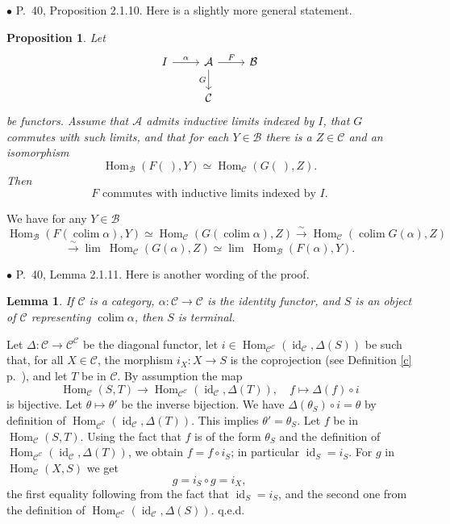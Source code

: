 \documentclass[12pt]{article}
\newtheorem{lem}[thm]{Lemma}
\newtheorem{prop}[thm]{Proposition}
\theoremstyle{remark}%
\newtheorem{rk}[thm]{Remark}
\newcommand{\bu}{\bullet}
\newcommand{\n}{\noindent}
\newcommand{\A}{\mathcal A}
\newcommand{\B}{\mathcal B}
\newcommand{\C}{\mathcal C}
\newcommand{\p}{\varphi}
\newcommand{\pf}{\n{\em Proof. }}
\newcommand{\bl}{\begin{lem}}
\newcommand{\el}{\end{lem}}
\newcommand{\bp}{\begin{prop}}
\newcommand{\ep}{\end{prop}}
\DeclareMathOperator*{\coli}{colim}
\DeclareMathOperator{\id}{id}
\DeclareMathOperator{\Hom}{Hom}
\DeclareMathOperator{\h}{Hom}
\DeclareMathOperator{\Ob}{Ob}
\begin{document}

\n$\bu$ P.~40, Proposition 2.1.10. Here is a slightly more general statement. 
%
\bp 
Let 
$$
\begin{tikzcd}
I\ar{r}{\alpha}&\A\ar{d}[swap]{G}\ar{r}{F}&\B\\
&\C
\end{tikzcd}
$$
be functors. Assume that $\A$ admits inductive limits indexed by $I$, that $G$ commutes with such limits, and that for each $Y\in\B$ there is a $Z\in\C$ and an isomorphism 
$$
\Hom_\B(F(\ ),Y)\simeq\Hom_\C(G(\ ),Z). 
$$
Then 
\begin{equation}\label{2.1.10}
F\text{ commutes with inductive limits indexed by }I.
\end{equation}
\ep
%
\pf We have for any $Y\in\B$ 
$$ 
\Hom_\B\left(F\left(\coli\alpha\right),Y\right)\simeq
\Hom_\C\left(G\left(\coli\alpha\right),Z\right)
\overset{\sim}{\to}
\Hom_\C\left(\coli G(\alpha),Z\right)
$$
$$
\overset{\sim}{\to}\lim \ \Hom_\C(G(\alpha),Z)\simeq\lim \ \Hom_\B(F(\alpha),Y).
$$  


\n$\bu$ P.~40, Lemma 2.1.11. Here is another wording of the proof. 
%
\bl 
If $\C$ is a category, $\alpha:\C\to\C$ is the identity functor, and $S$ is an object of $\C$ representing $\coli\alpha$, then $S$ is terminal. 
\el
%
\pf Let $\Delta:\C\to\C^\C$ be the diagonal functor, let $i\in\h_{\C^\C}(\id_\C,\Delta(S))$ be such that, for all $X\in\C$, the morphism $i_X:X\to S$ is the coprojection (see Definition \ref{c} p.~\pageref{c}), and let $T$ be in $\C$. By assumption the map 
$$
\h_\C(S,T)\to\h_{\C^\C}(\id_\C,\Delta(T)),\quad f\mapsto\Delta(f)\circ i 
$$ 
is bijective. Let $\theta\mapsto\theta'$ be the inverse bijection. We have $\Delta(\theta_S)\circ i=\theta$ by definition of $\h_{\C^\C}(\id_\C,\Delta(T))$. This implies $\theta'=\theta_S$. Let $f$ be in $\h_\C(S,T)$. Using the fact that $f$ is of the form $\theta_S$ and the definition of $\h_{\C^\C}(\id_\C,\Delta(T))$, we obtain $f=f\circ i_S$; in particular $\id_S=i_S$. For $g$ in $\h_\C(X,S)$ we get 
$$
g=i_S\circ g=i_X,
$$
the first equality following from the fact that $\id_S=i_S$, and the second one from the definition of $\h_{\C^\C}(\id_\C,\Delta(S))$. q.e.d.


\end{document}
